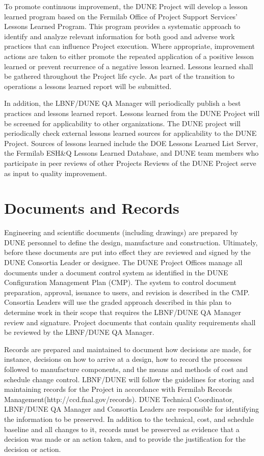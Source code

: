 To promote continuous improvement, the DUNE Project will develop a
lesson learned program based on the Fermilab Office of Project Support
Services’ Lessons Learned Program. This program provides a systematic
approach to identify and analyze relevant information for both good
and adverse work practices that can influence Project execution. Where
appropriate, improvement actions are taken to either promote the
repeated application of a positive lesson learned or prevent
recurrence of a negative lesson learned. Lessons learned shall be
gathered throughout the Project life cycle. As part of the transition
to operations a lessons learned report will be submitted.

In addition, the LBNF/DUNE QA Manager will periodically publish a best
practices and lessons learned report. Lessons learned from the DUNE
Project will be screened for applicability to other organizations. The
DUNE project will periodically check external lessons learned sources
for applicability to the DUNE Project. Sources of lessons learned
include the DOE Lessons Learned List Server, the Fermilab ESH\&Q
Lessons Learned Database, and DUNE team members who participate in
peer reviews of other Projects Reviews of the DUNE Project serve as
input to quality improvement.

\section{Documents and Records}

Engineering and scientific documents (including drawings) are prepared
by DUNE personnel to define the design, manufacture and
construction. Ultimately, before these documents are put into effect
they are reviewed and signed by the DUNE Consortia Leader or
designee. The DUNE Project Offices manage all documents under a
document control system as identified in the DUNE Configuration
Management Plan (CMP). The system to control document preparation,
approval, issuance to users, and revision is described in the
CMP. Consortia Leaders will use the graded approach described in this
plan to determine work in their scope that requires the LBNF/DUNE QA
Manager review and signature. Project documents that contain quality
requirements shall be reviewed by the LBNF/DUNE QA Manager.

Records are prepared and maintained to document how decisions are
made, for instance, decisions on how to arrive at a design, how to
record the processes followed to manufacture components, and the means
and methods of cost and schedule change control. LBNF/DUNE will follow
the guidelines for storing and maintaining records for the Project in
accordance with Fermilab Records
Management(http://ccd.fnal.gov/records). DUNE Technical Coordinator,
LBNF/DUNE QA Manager and Consortia Leaders are responsible for
identifying the information to be preserved. In addition to the
technical, cost, and schedule baseline and all changes to it, records
must be preserved as evidence that a decision was made or an action
taken, and to provide the justification for the decision or action.

